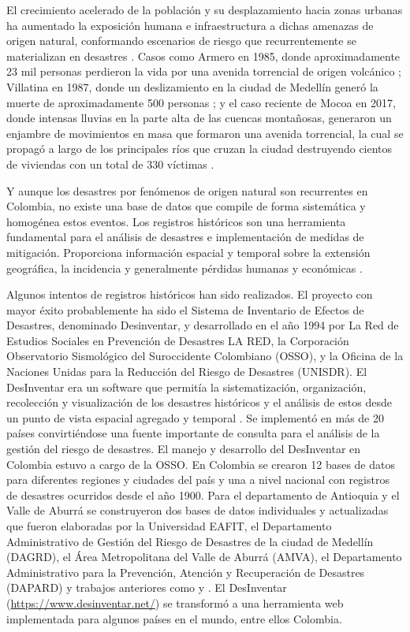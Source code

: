 \documentclass{article}
\begin{document}
El crecimiento acelerado de la población y su desplazamiento hacia zonas urbanas ha aumentado la exposición humana e infraestructura a dichas amenazas de origen natural, conformando escenarios de riesgo que recurrentemente se materializan en desastres \cite{aristizabal2020spatial}. Casos como Armero en 1985, donde aproximadamente 23 mil personas perdieron la vida por una avenida torrencial de origen volcánico \cite{hermelin2005desastres}; Villatina en 1987, donde un deslizamiento en la ciudad de Medellín generó la muerte de aproximadamente 500 personas \cite{garcia20055}; y el caso reciente de Mocoa en 2017, donde intensas lluvias en la parte alta de las cuencas montañosas, generaron un enjambre de movimientos en masa que formaron una avenida torrencial, la cual se propagó a largo de los principales ríos que cruzan la ciudad destruyendo cientos de viviendas con un total de 330 víctimas \cite{garcia2019dynamic}.

Y aunque los desastres por fenómenos de origen natural son recurrentes en Colombia, no existe una base de datos que compile de forma sistemática y homogénea estos eventos. Los registros históricos son una herramienta fundamental para el análisis de desastres e implementación de medidas de mitigación. Proporciona información espacial y temporal sobre la extensión geográfica, la incidencia y generalmente pérdidas humanas y económicas \cite{gomez2023spatial}.

Algunos intentos de registros históricos han sido realizados. El proyecto con mayor éxito probablemente ha sido el Sistema de Inventario de Efectos de Desastres, denominado Desinventar, y desarrollado en el año 1994 por La Red de Estudios Sociales en Prevención de Desastres LA RED, la Corporación Observatorio Sismológico del Suroccidente Colombiano (OSSO), y la Oficina de la Naciones Unidas para la Reducción del Riesgo de Desastres (UNISDR). El DesInventar era un software que permitía la sistematización, organización, recolección y visualización de los desastres históricos y el análisis de estos desde un punto de vista espacial agregado y temporal \cite{marulanda2010revealing}. Se implementó en más de 20 países convirtiéndose una fuente importante de consulta para el análisis de la gestión del riesgo de desastres. El manejo y desarrollo del DesInventar en Colombia estuvo a cargo de la OSSO. En Colombia se crearon 12 bases de datos para diferentes regiones y ciudades del país y una a nivel nacional con registros de desastres ocurridos desde el año 1900. Para el departamento de Antioquia y el Valle de Aburrá se construyeron dos bases de datos individuales y actualizadas que fueron elaboradas por la Universidad EAFIT, el Departamento Administrativo de Gestión del Riesgo de Desastres de la ciudad de Medellín (DAGRD), el Área Metropolitana del Valle de Aburrá (AMVA), el Departamento Administrativo para la Prevención, Atención y Recuperación de Desastres (DAPARD) y trabajos anteriores como  y . El DesInventar (\url{https://www.desinventar.net/}) se transformó a una herramienta web implementada para algunos países en el mundo, entre ellos Colombia. 
\end{document}
